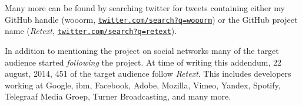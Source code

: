 \noindent Many more can be found by searching twitter for tweets containing either
  my GitHub handle (wooorm,
  \href{https://twitter.com/search?f=realtime&q=wooorm}{\nolinkurl{twitter.com/search?q=wooorm}})
  or the GitHub project name (\emph{Retext},
  \href{https://twitter.com/search?f=realtime&q=retext}{\nolinkurl{twitter.com/search?q=retext}}).

In addition to mentioning the project on social networks many of the target
  audience started \emph{following} the project.
At time of writing this addendum, 22 august, 2014, 451 of the target
  audience follow \emph{Retext}.
This includes developers working at Google, \gls{ibm}, Facebook, Adobe,
  Mozilla, Vimeo, Yandex, Spotify, Telegraaf Media Groep, Turner Broadcasting,
  and many more.

\endgroup
